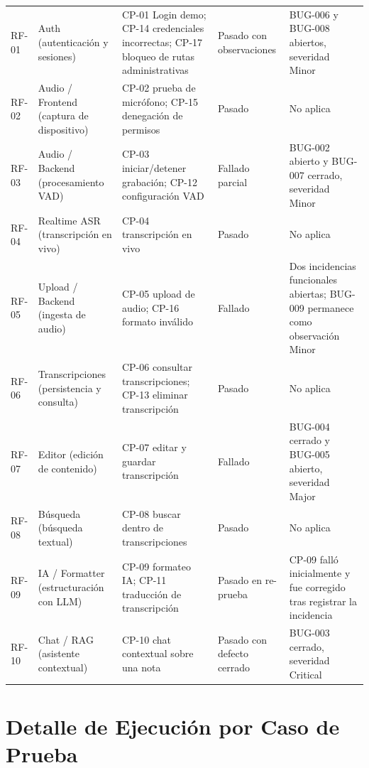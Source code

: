 \begin{landscape}
\begin{longtable}{p{1.4cm}p{5.2cm}p{4.6cm}p{3cm}p{4.6cm}}
RF-01 & Auth (autenticación y sesiones) & CP-01 Login demo; CP-14 credenciales incorrectas; CP-17 bloqueo de rutas administrativas & \textcolor{PasoColor}{Pasado con observaciones} & BUG-006 y BUG-008 abiertos, severidad Minor\\
RF-02 & Audio / Frontend (captura de dispositivo) & CP-02 prueba de micrófono; CP-15 denegación de permisos & \textcolor{PasoColor}{Pasado} & No aplica\\
RF-03 & Audio / Backend (procesamiento VAD) & CP-03 iniciar/detener grabación; CP-12 configuración VAD & \textcolor{FalloColor}{Fallado parcial} & BUG-002 abierto y BUG-007 cerrado, severidad Minor\\
RF-04 & Realtime ASR (transcripción en vivo) & CP-04 transcripción en vivo & \textcolor{PasoColor}{Pasado} & No aplica\\
RF-05 & Upload / Backend (ingesta de audio) & CP-05 upload de audio; CP-16 formato inválido & \textcolor{FalloColor}{Fallado} & Dos incidencias funcionales abiertas; BUG-009 permanece como observación Minor\\
RF-06 & Transcripciones (persistencia y consulta) & CP-06 consultar transcripciones; CP-13 eliminar transcripción & \textcolor{PasoColor}{Pasado} & No aplica\\
RF-07 & Editor (edición de contenido) & CP-07 editar y guardar transcripción & \textcolor{FalloColor}{Fallado} & BUG-004 cerrado y BUG-005 abierto, severidad Major\\
RF-08 & Búsqueda (búsqueda textual) & CP-08 buscar dentro de transcripciones & \textcolor{PasoColor}{Pasado} & No aplica\\
RF-09 & IA / Formatter (estructuración con LLM) & CP-09 formateo IA; CP-11 traducción de transcripción & \textcolor{PasoColor}{Pasado en re-prueba} & CP-09 falló inicialmente y fue corregido tras registrar la incidencia\\
RF-10 & Chat / RAG (asistente contextual) & CP-10 chat contextual sobre una nota & \textcolor{PasoColor}{Pasado con defecto cerrado} & BUG-003 cerrado, severidad Critical\\

\bottomrule
\end{longtable}
\end{landscape}

\section{Detalle de Ejecución por Caso de Prueba}

